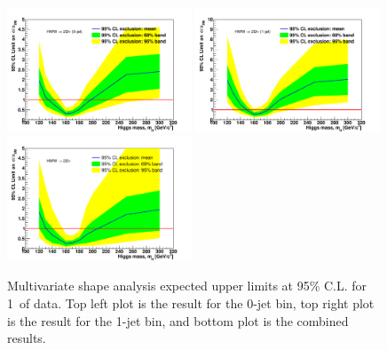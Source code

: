 \begin{figure}[!htbp]
\begin{center}
   \includegraphics[width=0.49\textwidth]{figures/limits_mva_shape_1ifb_0jet.pdf}
   \includegraphics[width=0.49\textwidth]{figures/limits_mva_shape_1ifb_1jet.pdf}
   \includegraphics[width=0.49\textwidth]{figures/limits_mva_shape_1ifb_combined.pdf}
   \caption{Multivariate shape analysis expected upper limits at 95\% C.L. for 1\ifb\ of data. Top left plot 
   is the result for the 0-jet bin, top right plot is the result for the 1-jet bin, and 
   bottom plot is the combined results.}
   \label{fig:mvashape_uls}
\end{center}
\end{figure}
